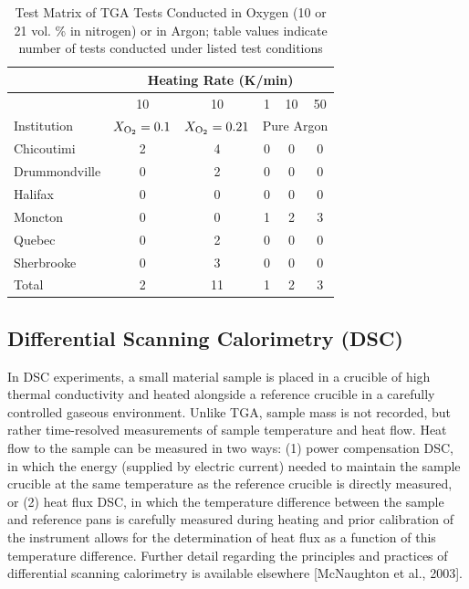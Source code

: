 \documentclass{book}
\begin{document}
\begin{table}
\caption{Test Matrix of TGA Tests Conducted in Oxygen (10 or 21 vol. \% in nitrogen) or in Argon; table values indicate number of tests conducted under listed test conditions}
\label{Table_4}
\begin{center}
\begin{tabular}{lccccc}
              & \multicolumn{5}{c}{Heating Rate (K/min)} \\ \hline
              & 10 & 10 & 1 & 10 & 50  \\ \hline
Institution   & $X_{\rm O_2}=0.1$ & $X_{\rm O_2}=0.21$ & \multicolumn{3}{c}{Pure Argon}  \\ \hline
Chicoutimi    & 2 & 4   & 0 & 0 & 0 \\
Drummondville & 0 & 2   & 0 & 0 & 0 \\
Halifax       & 0 & 0   & 0 & 0 & 0 \\
Moncton       & 0 & 0   & 1 & 2 & 3 \\
Quebec        & 0 & 2   & 0 & 0 & 0 \\
Sherbrooke    & 0 & 3   & 0 & 0 & 0 \\ \hline
Total         & 2 & 11  & 1 & 2 & 3 \\ \hline
\end{tabular}
\end{center}
\end{table}


\subsection{Differential Scanning Calorimetry (DSC)}

In DSC experiments, a small material sample is placed in a crucible of high thermal conductivity and heated alongside a reference crucible in a carefully controlled gaseous environment. Unlike TGA, sample mass is not recorded, but rather time-resolved measurements of sample temperature and heat flow. Heat flow to the sample can be measured in two ways: (1) power compensation DSC, in which the energy (supplied by electric current) needed to maintain the sample crucible at the same temperature as the reference crucible is directly measured, or (2) heat flux DSC, in which the temperature difference between the sample and reference pans is carefully measured during heating and prior calibration of the instrument allows for the determination of heat flux as a function of this temperature difference. Further detail regarding the principles and practices of differential scanning calorimetry is available elsewhere [McNaughton et al., 2003].
\end{document}
